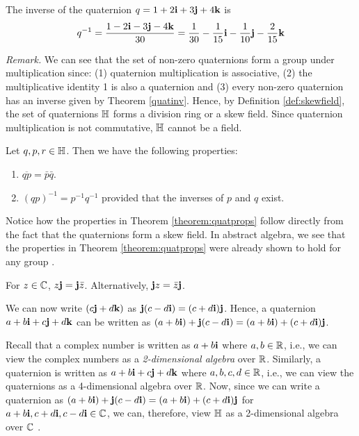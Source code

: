 \begin{ex}
	The inverse of the quaternion $q = 1+2\textbf{i}+3\textbf{j}+4\textbf{k}$ is $$q^{-1} = \frac{1-2\textbf{i}-3\textbf{j}-4\textbf{k}}{30} = \frac{1}{30} - \frac{1}{15}\textbf{i} - \frac{1}{10}\textbf{j} - \frac{2}{15}\textbf{k}$$
\end{ex}

\textit{Remark.} We can see that the set of non-zero quaternions form a group under multiplication since: (1) quaternion multiplication is associative, (2) the multiplicative identity 1 is also a quaternion and (3) every non-zero quaternion has an inverse given by Theorem \ref{quatinv}. Hence, by Definition \ref{def:skewfield}, the set of quaternions $\operatorname{\mathbb{H}}$ forms a division ring or a skew field. Since quaternion multiplication is not commutative, $\operatorname{\mathbb{H}}$ cannot be a field.

\begin{theorem} \label{theorem:quatprops}
\emph{\cite{lerios}} Let $q, p, r \in \operatorname{\mathbb{H}}$. Then we have the following properties:
	\begin{enumerate}
		\item $\overline{qp} = \bar{p}\bar{q}$.
		\item $(qp)^{-1} = p^{-1}q^{-1}$ provided that the inverses of $p$ and $q$ exist. 
	\end{enumerate}
\end{theorem}

Notice how the properties in Theorem \ref{theorem:quatprops} follow directly from the fact that the quaternions form a skew field. In abstract algebra, we see that the properties in Theorem \ref{theorem:quatprops} were already shown to hold for any group \cite{fraleigh}.

\begin{theorem} \label{jx}
	\emph{\cite{aslaksen}} For $z \in \operatorname{\mathbb{C}}$, $z\textbf{j} = \textbf{j}\bar{z}$. Alternatively, $\textbf{j} z = \bar{z}\textbf{j}$. \cite{aslaksen}
\end{theorem}

We can now write $(c\textbf{j}+d\textbf{k})$ as $\textbf{j}(c-d\textbf{i}) = (c+d\textbf{i})\textbf{j}$. Hence, a quaternion $a + b\textbf{i} + c\textbf{j} + d\textbf{k}$ can be written as $(a+b\textbf{i})+\textbf{j}(c-d\textbf{i}) = (a+b\textbf{i})+(c+d\textbf{i})\textbf{j}$. 

Recall that a complex number is written as $a+b\textbf{i}$ where $a,b \in \operatorname{\mathbb{R}}$, i.e., we can view the complex numbers as a \emph{2-dimensional algebra} over $\operatorname{\mathbb{R}}$. Similarly, a quaternion is written as $a + b\textbf{i} + c\textbf{j} + d\textbf{k}$ where $a,b,c,d \in \operatorname{\mathbb{R}}$, i.e., we can view the quaternions as a 4-dimensional algebra over $\operatorname{\mathbb{R}}$. Now, since we can write a quaternion as $(a+b\textbf{i})+\textbf{j}(c-d\textbf{i}) = (a+b\textbf{i})+(c+d\textbf{i})\textbf{j}$ for $a+b\textbf{i},c+d\textbf{i},c-d\textbf{i} \in \operatorname{\mathbb{C}}$, we can, therefore, view $\operatorname{\mathbb{H}}$ as a 2-dimensional algebra over $\operatorname{\mathbb{C}}$ \cite{stamaria}.

